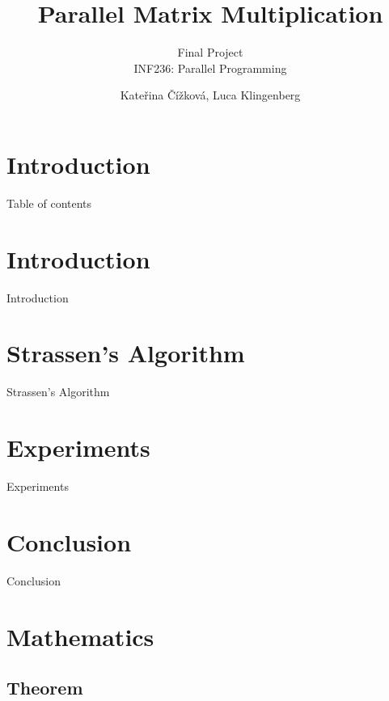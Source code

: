 \documentclass[UKenglish]{beamer}
\author{Kate\v{r}ina \v{C}\'{i}\v{z}kov\'{a}, Luca Klingenberg}
\title{Parallel Matrix Multiplication}
\subtitle{Final Project\\ INF236: Parallel Programming}
\begin{document}
\section{Introduction}
%
%
\begin{frame}{Table of contents}
    \tableofcontents[currentsection]
\end{frame}

\section{Introduction}

\begin{frame}{Introduction}

\end{frame}

\section{Strassen's Algorithm}

\begin{frame}{Strassen's Algorithm}

\end{frame}

\section{Experiments}

\begin{frame}{Experiments}

\end{frame}

\section{Conclusion}

\begin{frame}{Conclusion}

\end{frame}


\if{}
\section{Mathematics}
\subsection{Theorem}
\end{document}
